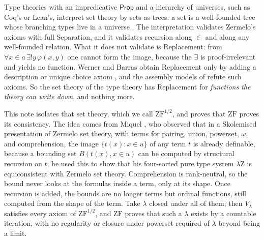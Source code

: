 \documentclass[10pt]{article}
\newcommand{\Prop}{\mathsf{Prop}}
\newcommand{\ZF}{\mathrm{ZF}}
\newcommand{\ZFh}{\mathrm{ZF}^{1/2}}
\begin{document}
Type theories with an impredicative $\Prop$ and a hierarchy of universes,
such as Coq's or Lean's, interpret set theory by sets-as-trees: a set is a
well-founded tree whose branching types live in a universe
\cite{aczel78,werner97,barras10}. The interpretation validates Zermelo's
axioms with full Separation, and it validates recursion along $\in$ and
along any well-founded relation. What it does not validate is Replacement:
from $\forall x{\in}a\,\exists!y\,\varphi(x,y)$ one cannot form the image,
because the $\exists$ is proof-irrelevant and yields no function. Werner
and Barras obtain Replacement only by adding a description or unique
choice axiom \cite{werner97,barras10}, and the assembly models of
\cite{vdbergotten23} refute such axioms. So the set theory of the type
theory has Replacement for \emph{functions the theory can write down}, and
nothing more.

This note isolates that set theory, which we call $\ZFh$, and proves that
$\ZF$ proves its consistency. The idea comes from Miquel
\cite{miquel06}, who observed that in a Skolemised presentation of
Zermelo set theory, with terms for pairing, union, powerset, $\omega$, and
comprehension, the image $\{t(x):x\in u\}$ of any term $t$ is already
definable, because a bounding set $B(t(x),x\in u)$ can be computed by
structural recursion on $t$; he used this to show that his four-sorted
pure type system $\lambda\mathrm Z$ is equiconsistent with Zermelo set
theory. Comprehension is rank-neutral, so the bound never looks at the
formulas inside a term, only at its shape. Once recursion is added, the
bounds are no longer terms but ordinal functions, still computed from the
shape of the term. Take $\lambda$ closed under all of them; then
$V_\lambda$ satisfies every axiom of $\ZFh$, and $\ZF$ proves that such a
$\lambda$ exists by a countable iteration, with no regularity or closure
under powerset required of $\lambda$ beyond being a limit.
\end{document}
